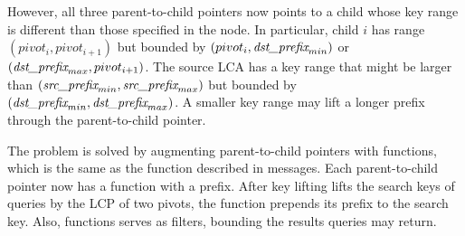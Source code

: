 However, all three parent-to-child pointers now points to a child whose key
range is different than those specified in the node.
In particular, child $i$ has range $(pivot_{i},pivot_{i+1})$ but bounded by
$(pivot_{i},\textit{dst\_prefix}_{min})$ or $(\textit{dst\_prefix}_{max}, pivot_{i+1})$.
The source LCA has a key range that might be larger than
$(\textit{src\_prefix}_{min}, \textit{src\_prefix}_{max})$ but bounded by $(\textit{dst\_prefix}_{min},\textit{dst\_prefix}_{max})$.
A smaller key range may lift a longer prefix through the parent-to-child
pointer.

The problem is solved by augmenting parent-to-child pointers with \xf functions,
which is the same as the \xf function described in \goto messages.
Each parent-to-child pointer now has a \xf function with a prefix.
After key lifting lifts the search keys of queries by the LCP of two pivots,
the \xf function prepends its prefix to the search key.
Also, \xf functions serves as filters, bounding the results queries may return.

